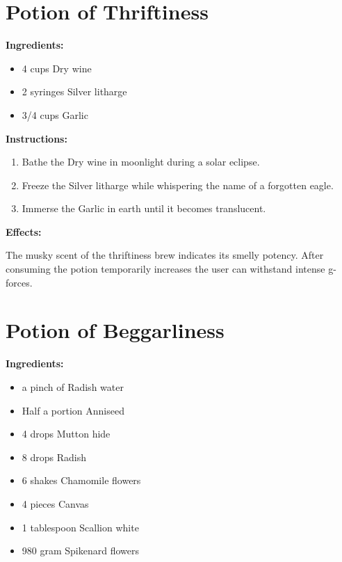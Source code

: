 \documentclass{article}
\begin{document}
\newpage
\section*{Potion of Thriftiness}

\textbf{Ingredients:}

\begin{itemize}
  \item 4 cups Dry wine
  \item 2 syringes Silver litharge
  \item 3/4 cups Garlic
\end{itemize}

\textbf{Instructions:}

\begin{enumerate}
  \item Bathe the Dry wine in moonlight during a solar eclipse.
  \item Freeze the Silver litharge while whispering the name of a forgotten eagle.
  \item Immerse the Garlic in earth until it becomes translucent.
\end{enumerate}

\textbf{Effects:}

The musky scent of the thriftiness brew indicates its smelly potency. After consuming the potion temporarily increases the user can withstand intense g- forces.

\newpage
\section*{Potion of Beggarliness}

\textbf{Ingredients:}

\begin{itemize}
  \item a pinch of Radish water
  \item Half a portion Anniseed
  \item 4 drops Mutton hide
  \item 8 drops Radish
  \item 6 shakes Chamomile flowers
  \item 4 pieces Canvas
  \item 1 tablespoon Scallion white
  \item 980 gram Spikenard flowers
\end{itemize}
\end{document}
